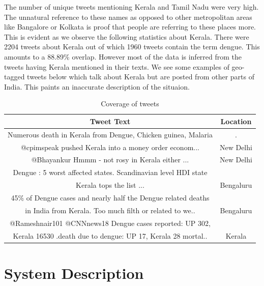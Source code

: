 \documentclass[journal, a4paper]{IEEEtran}
\begin{document}
The number of unique tweets mentioning Kerala and Tamil Nadu were very high. The unnatural reference to these names as opposed to other metropolitan areas like Bangalore or Kolkata is proof that people are referring to these places more. This is evident as we observe the following statistics about Kerala. There were 2204 tweets about Kerala out of which 1960 tweets contain the term dengue. 
This amounts to a 88.89\% overlap.
However most of the data is inferred  from the tweets having Kerala mentioned in their texts. We see some examples of geo-tagged tweets below which talk about Kerala but are posted from other parts of India. This paints an inaccurate description of the situaion. 
	\begin{table}[!hbt]
		\begin{center}
			\caption{Coverage of tweets}
			\label{tab:Kerala}
			\begin{tabular}{|c|c|}
				\hline
				Tweet Text&Location \\\hline
				Numerous death in Kerala from Dengue,  Chicken guinea,  Malaria&.\\
				@cpimspeak pushed Kerala into a money order econom... & New Delhi\\\hline
				@Bhayankur Hmmm - not rosy in Kerala either ... & New Delhi\\\hline
				Dengue : 5 worst affected states. Scandinavian level HDI state &\\
				Kerala tops the list ... & Bengaluru \\\hline
				45\% of Dengue cases and nearly half the Dengue related deaths&\\
				 in India from Kerala. Too much filth or related to we.. &Bengaluru \\\hline
				@Rameshnair101 @CNNnews18 Dengue cases reported: UP 302,&\\ Kerala 16530
				 .death due to dengue: UP 17, Kerala 28 mortal.. & Kerala\\

				
				\hline
				
				\hline
			\end{tabular}
		\end{center}
	\end{table}

\section{System Description}
\href{https://github.com/JaredHawkins/TweetGeoViz}\\
\end{document}
